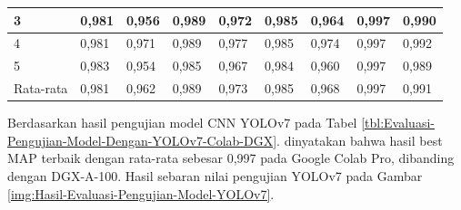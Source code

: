 \begin{singlespace}
\begin{table}[H]
\begin{tabular}{|p{1cm}|p{1cm}p{1cm}|p{1cm}p{1cm}|p{1cm}p{1cm}|p{1cm}p{1cm}|}
			3                                              & \multicolumn{1}{p{1cm}|}{0,981}                                    & 0,956     & \multicolumn{1}{p{1cm}|}{0,989}                                    & 0,972     & \multicolumn{1}{p{1cm}|}{0,985}                                    & 0,964     & \multicolumn{1}{p{1cm}|}{0,997}                                     & 0,990     \\ \hline
			
			4                                              & \multicolumn{1}{p{1cm}|}{0,981}                                    & 0,971     & \multicolumn{1}{p{1cm}|}{0,989}                                    & 0,977     & \multicolumn{1}{p{1cm}|}{0,985}                                    & 0,974     & \multicolumn{1}{p{1cm}|}{0,997}                                     & 0,992     \\ \hline
			
			5                                              & \multicolumn{1}{p{1cm}|}{0,983}                                    & 0,954     & \multicolumn{1}{p{1cm}|}{0,985}                                    & 0,967     & \multicolumn{1}{p{1cm}|}{0,984}                                    & 0,960     & \multicolumn{1}{p{1cm}|}{0,997}                                     & 0,989     \\ \hline
			
			Rata-rata                                      & \multicolumn{1}{p{1cm}|}{0,981}                                    & 0,962     & \multicolumn{1}{p{1cm}|}{0,989}                                    & 0,973     & \multicolumn{1}{p{1cm}|}{0,985}                                    & 0,968     & \multicolumn{1}{p{1cm}|}{0,997}                                     & 0,991     \\ \hline
			
		\end{tabular}
	\end{table}
\end{singlespace}

Berdasarkan hasil pengujian model CNN YOLOv7 pada Tabel \ref{tbl:Evaluasi-Pengujian-Model-Dengan-YOLOv7-Colab-DGX}. dinyatakan bahwa hasil best MAP terbaik dengan rata-rata sebesar 0,997 pada Google Colab Pro, dibanding dengan DGX-A-100. Hasil sebaran nilai pengujian YOLOv7 pada Gambar \ref{img:Hasil-Evaluasi-Pengujian-Model-YOLOv7}.

